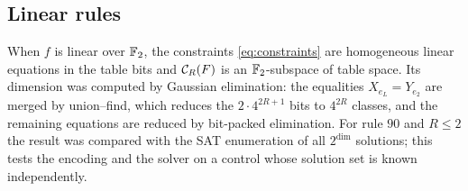 \subsection{Linear rules}
When $f$ is linear over $\mathbb{F}_2$, the constraints \eqref{eq:constraints} are homogeneous linear equations in the table bits and $\mathcal{C}_R(F)$ is an $\mathbb{F}_2$-subspace of table space. Its dimension was computed by Gaussian elimination: the equalities $X_{e_L}=Y_{e_2}$ are merged by union--find, which reduces the $2\cdot4^{2R+1}$ bits to $4^{2R}$ classes, and the remaining equations are reduced by bit-packed elimination. For rule $90$ and $R\le2$ the result was compared with the SAT enumeration of all $2^{\dim}$ solutions; this tests the encoding and the solver on a control whose solution set is known independently.

